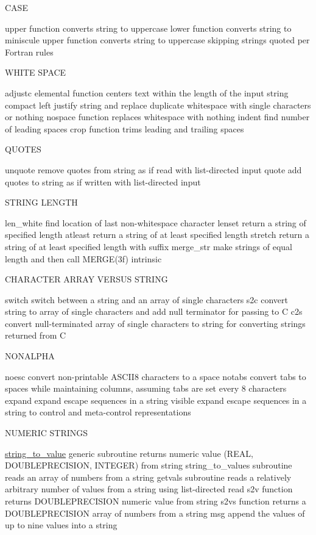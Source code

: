 C\+A\+SE

upper function converts string to uppercase lower function converts string to miniscule upper function converts string to uppercase skipping strings quoted per Fortran rules

W\+H\+I\+TE S\+P\+A\+CE

adjustc elemental function centers text within the length of the input string compact left justify string and replace duplicate whitespace with single characters or nothing nospace function replaces whitespace with nothing indent find number of leading spaces crop function trims leading and trailing spaces

Q\+U\+O\+T\+ES

unquote remove quotes from string as if read with list-\/directed input quote add quotes to string as if written with list-\/directed input

S\+T\+R\+I\+NG L\+E\+N\+G\+TH

len\+\_\+white find location of last non-\/whitespace character lenset return a string of specified length atleast return a string of at least specified length stretch return a string of at least specified length with suffix merge\+\_\+str make strings of equal length and then call M\+E\+R\+G\+E(3f) intrinsic

C\+H\+A\+R\+A\+C\+T\+ER A\+R\+R\+AY V\+E\+R\+S\+US S\+T\+R\+I\+NG

switch switch between a string and an array of single characters s2c convert string to array of single characters and add null terminator for passing to C c2s convert null-\/terminated array of single characters to string for converting strings returned from C

N\+O\+N\+A\+L\+P\+HA

noesc convert non-\/printable A\+S\+C\+I\+I8 characters to a space notabs convert tabs to spaces while maintaining columns, assuming tabs are set every 8 characters expand expand escape sequences in a string visible expand escape sequences in a string to control and meta-\/control representations

N\+U\+M\+E\+R\+IC S\+T\+R\+I\+N\+GS

\mbox{\hyperlink{interfacem__strings_1_1string__to__value}{string\+\_\+to\+\_\+value}} generic subroutine returns numeric value (R\+E\+AL, D\+O\+U\+B\+L\+E\+P\+R\+E\+C\+I\+S\+I\+ON, I\+N\+T\+E\+G\+ER) from string string\+\_\+to\+\_\+values subroutine reads an array of numbers from a string getvals subroutine reads a relatively arbitrary number of values from a string using list-\/directed read s2v function returns D\+O\+U\+B\+L\+E\+P\+R\+E\+C\+I\+S\+I\+ON numeric value from string s2vs function returns a D\+O\+U\+B\+L\+E\+P\+R\+E\+C\+I\+S\+I\+ON array of numbers from a string msg append the values of up to nine values into a string

